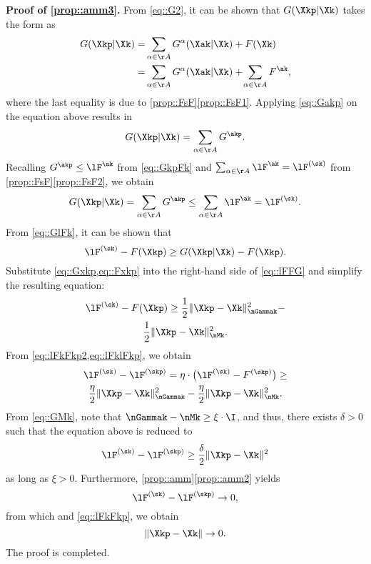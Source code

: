 \vspace{0.8em} 
\noindent\textbf{Proof of \ref{prop::amm3}.\;} From \cref{eq::G2}, it can be shown that $G(\Xkp|\Xk)$ takes the form as
\begin{equation}
	\nonumber
	\begin{aligned}
	G(\Xkp|\Xk) =& \sum_{\alpha\in\AA}G^\alpha(\Xak|\Xk) + F(\Xk)\\
	=&\sum_{\alpha\in\AA}G^\alpha(\Xak|\Xk) +\!\sum_{\alpha\in\AA} F^{\ak},
	\end{aligned}
\end{equation}
where the last equality is due to \cref{prop::FsF}\ref{prop::FsF1}. Applying \cref{eq::Gakp} on the equation above results in
\begin{equation}\label{eq::Gk}
G(\Xkp|\Xk)=\sum_{\alpha\in\AA} G^{\akp}.
\end{equation}
Recalling $G^{\akp}\leq \lF^{\ak}$ from \cref{eq::GkpFk} and $\sum_{\alpha\in\AA}\lF^{\ak} = \lF^{(\sk)}$ from \cref{prop::FsF}\ref{prop::FsF2}, we obtain
\begin{equation}\label{eq::GlFk}
	G(\Xkp|\Xk) = \sum_{\alpha\in\AA} G^{\akp} \leq \sum_{\alpha\in\AA} \lF^{\ak} = \lF^{(\sk)}.
\end{equation}
From \cref{eq::GlFk}, it can be shown that
\begin{equation}\label{eq::lFFG}
	\lF^{(\sk)} - F(\Xkp)\geq G(\Xkp|\Xk) - F(\Xkp).
\end{equation}
Substitute \cref{eq::Gxkp,eq::Fxkp} into the right-hand side of \cref{eq::lFFG} and simplify the resulting equation:
\begin{multline}\label{eq::lFkFkp2}
	\lF^{(\sk)} - F(\Xkp)\geq \frac{1}{2}\|\Xkp-\Xk\|_{\nGammak}^2-\\
	\frac{1}{2}\|\Xkp-\Xk\|_{\nMk}^2.
\end{multline}
From \cref{eq::lFkFkp2,eq::lFklFkp}, we obtain
\begin{multline}
	\nonumber
	\lF^{(\sk)}-\lF^{(\skp)}= \eta\cdot\big(\lF^{(\sk)}-F^{(\skp)}\big)\geq\\
	\frac{\eta}{2}\|\Xkp-\Xk\|_{\nGammak}^2-\frac{\eta}{2}\|\Xkp-\Xk\|_{\nMk}^2.
\end{multline}
From \cref{eq::GMk}, note that $\nGammak-\nMk\geq \xi\cdot\I$, and thus, there exists $\delta > 0$ such that the equation above is reduced to
\begin{equation}\label{eq::lFkFkp}
	\lF^{(\sk)} - \lF^{(\skp)} \geq \frac{\delta}{2}\|\Xkp-\Xk\|^2
\end{equation}
as long as $\xi>0$. Furthermore, \cref{prop::amm}\ref{prop::amm2} yields $$\lF^{(\sk)}-\lF^{(\skp)}\rightarrow 0,$$ from which and \cref{eq::lFkFkp}, we obtain
\begin{equation}\label{eq::XkpXk}
	\|\Xkp-\Xk\|\rightarrow 0.
\end{equation}
The proof is completed.

